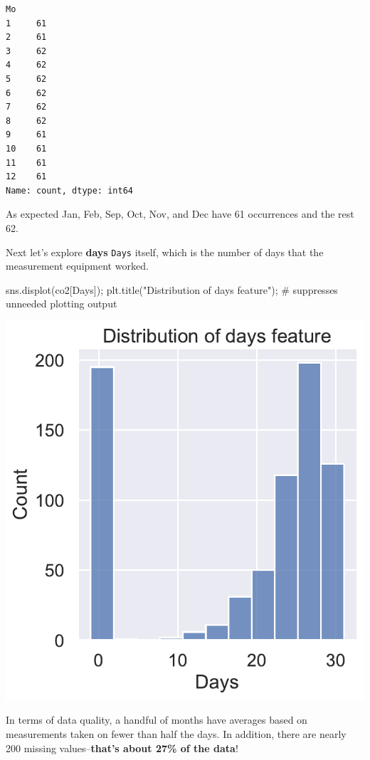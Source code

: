 \documentclass[
  letterpaper,
  DIV=11,
  numbers=noendperiod]{scrreprt}
\newenvironment{Shaded}{\begin{snugshade}}{\end{snugshade}}
\newcommand{\CommentTok}[1]{\textcolor[rgb]{0.37,0.37,0.37}{#1}}
\newcommand{\NormalTok}[1]{\textcolor[rgb]{0.00,0.23,0.31}{#1}}
\newcommand{\OperatorTok}[1]{\textcolor[rgb]{0.37,0.37,0.37}{#1}}
\newcommand{\StringTok}[1]{\textcolor[rgb]{0.13,0.47,0.30}{#1}}
\begin{document}
\begin{verbatim}
Mo
1     61
2     61
3     62
4     62
5     62
6     62
7     62
8     62
9     61
10    61
11    61
12    61
Name: count, dtype: int64
\end{verbatim}

As expected Jan, Feb, Sep, Oct, Nov, and Dec have 61 occurrences and the
rest 62.

Next let's explore \textbf{days} \texttt{Days} itself, which is the
number of days that the measurement equipment worked.

\begin{Shaded}
\begin{Highlighting}[]
\NormalTok{sns.displot(co2[}\StringTok{\textquotesingle{}Days\textquotesingle{}}\NormalTok{])}\OperatorTok{;}
\NormalTok{plt.title(}\StringTok{"Distribution of days feature"}\NormalTok{)}\OperatorTok{;} \CommentTok{\# suppresses unneeded plotting output}
\end{Highlighting}
\end{Shaded}

\includegraphics{eda/eda_files/figure-pdf/cell-67-output-1.pdf}

In terms of data quality, a handful of months have averages based on
measurements taken on fewer than half the days. In addition, there are
nearly 200 missing values--\textbf{that's about 27\% of the data}!
\end{document}
